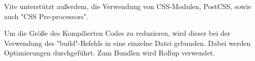 
Vite unterstützt außerdem, die Verwendung von CSS-Modulen, PostCSS, sowie auch "CSS Pre-processors". \cite{ViteFeatures}

\begin{minipage}{\textwidth}

    
    Um die Größe des Kompilierten Codes zu reduzieren, wird dieser bei der Verwendung des "build"-Befehls in eine einzelne Datei gebunden. Dabei werden Optimierungen durchgeführt. Zum Bundlen wird Rollup \cite{Rollup} verwendet.

\end{minipage}
    
    

